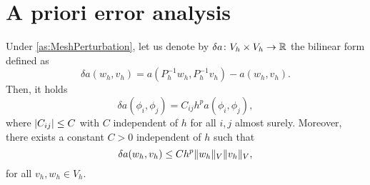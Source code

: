 \documentclass[10pt]{article}
\begin{document}
\section{A priori error analysis}

\begin{lemma}\label{lem:DistATildaA} Under \cref{as:MeshPerturbation}, let us denote by $\delta a \colon V_h \times V_h \to \mathbb{R}$ the bilinear form defined as
	\begin{equation}
	\delta a(w_h, v_h) = a(P_h^{-1}w_h, P_h^{-1}v_h) - a(w_h, v_h).
	\end{equation}
	Then, it holds
	\begin{equation}\label{eq:Lemma1Eq1}
		\delta a(\phi_i, \phi_j) = C_{ij} h^p a(\phi_i, \phi_j),
	\end{equation}
	where $\lvert C_{ij}\rvert \leq C$ with $C$ independent of $h$ for all $i, j$ almost surely. Moreover, there exists a constant $C > 0$ independent of $h$ such that
	\begin{equation}\label{eq:Lemma1Eq2}
		\delta a(w_h, v_h) \leq Ch^p \lVert w_h\rVert_V \lVert v_h\rVert_V,
	\end{equation}
	for all $v_h, w_h \in V_h$.
\end{lemma}
\end{document}
